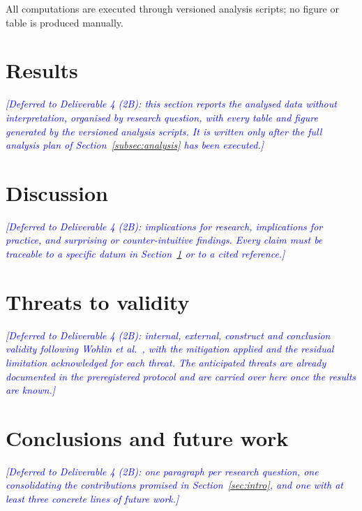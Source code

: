 \documentclass[pdflatex,sn-mathphys-num]{sn-jnl}
\newcommand{\DEFERRED}[1]{\textcolor{blue}{\textit{[Deferred to Deliverable 4 (2B): #1]}}}
\theoremstyle{thmstyleone}%
\theoremstyle{thmstyletwo}%
\theoremstyle{thmstylethree}%
\begin{document}
All computations are executed through versioned analysis scripts; no figure or
table is produced manually.

\section{Results}\label{sec:results}

\DEFERRED{this section reports the analysed data without interpretation,
organised by research question, with every table and figure generated by the
versioned analysis scripts. It is written only after the full analysis plan of
Section~\ref{subsec:analysis} has been executed.}

\section{Discussion}\label{sec:discussion}

\DEFERRED{implications for research, implications for practice, and surprising
or counter-intuitive findings. Every claim must be traceable to a specific datum
in Section~\ref{sec:results} or to a cited reference.}

\section{Threats to validity}\label{sec:threats}

\DEFERRED{internal, external, construct and conclusion validity following Wohlin
et al.~\cite{wohlin2012}, with the mitigation applied and the residual
limitation acknowledged for each threat. The anticipated threats are already
documented in the preregistered protocol and are carried over here once the
results are known.}

\section{Conclusions and future work}\label{sec:conclusions}

\DEFERRED{one paragraph per research question, one consolidating the
contributions promised in Section~\ref{sec:intro}, and one with at least three
concrete lines of future work.}
\end{document}
